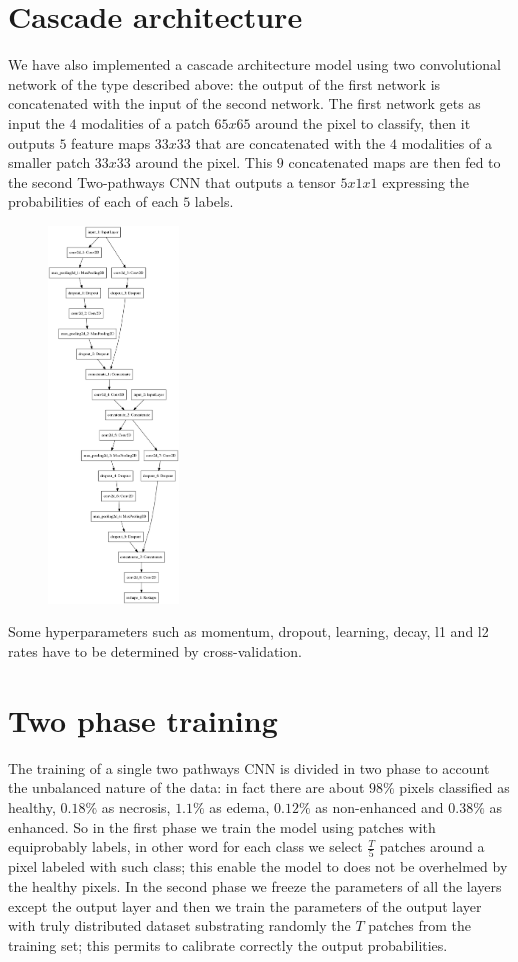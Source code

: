 \documentclass[openany,12pt,english]{book}
\begin{document}
	\chapter{Cascade architecture}
	We have also implemented a cascade architecture model using two convolutional network of the type described above: the output of the first network is concatenated with the input of the second network.
	The first network gets as input the $4$ modalities of a patch $65x65$ around the pixel to classify, then it outputs $5$ feature maps $33x33$ that are concatenated with the $4$ modalities of a smaller patch $33x33$ around the pixel. This $9$ concatenated maps are then fed to the second Two-pathways CNN that outputs a tensor $5x1x1$ expressing the probabilities of each of each $5$ labels. 
	\begin{figure}[htbp]
		\centering
		\includegraphics[height=10cm,keepaspectratio]{CascadeModel.png}
		\caption{\label{fig:CascadeModel}}
	\end{figure}
	 
	Some hyperparameters such as momentum, dropout, learning, decay, l1 and l2 rates have to be determined by cross-validation.
	
	\chapter{Two phase training}
	The training of a single two pathways CNN is divided in two phase to account the unbalanced nature of the data: in fact there are about $98 \%$ pixels classified as healthy, $0.18\%$ as necrosis, $1.1\%$ as edema, $0.12\%$ as non-enhanced and $0.38\%$ as enhanced.
	So in the first phase we train the model using patches with equiprobably labels, in other word for each class we select $\frac{T}{5}$ patches around a pixel labeled with such class; this enable the model to does not be overhelmed by the healthy pixels.
	In the second phase we freeze the parameters of all the layers except the output layer and then we train the parameters of the output layer with truly distributed dataset substrating randomly the $T$ patches from the training set; this permits to calibrate correctly the output probabilities.
	
\end{document}
